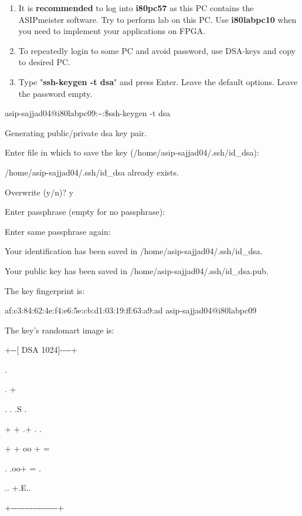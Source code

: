 \begin{enumerate}
	\def\labelenumi{\arabic{enumi}.}
	\setcounter{enumi}{7}
	\item
	It is \textbf{recommended} to log into \textbf{i80pc57} as this PC
	contains the ASIPmeister software. Try to perform lab on this PC. Use
	\textbf{i80labpc10} when you need to implement your applications on
	FPGA.
	\item
	To repeatedly login to some PC and avoid password, use DSA-keys and
	copy to desired PC.
	\item
	Type "\textbf{ssh-keygen -t dsa}" and press Enter. Leave the default
	options. Leave the password empty.
\end{enumerate}

asip-sajjad04@i80labpc09:\textasciitilde:\$ssh-keygen -t dsa

Generating public/private dsa key pair.

Enter file in which to save the key (/home/asip-sajjad04/.ssh/id\_dsa):

/home/asip-sajjad04/.ssh/id\_dsa already exists.

Overwrite (y/n)? y

Enter passphrase (empty for no passphrase):

Enter same passphrase again:

Your identification has been saved in /home/asip-sajjad04/.ssh/id\_dsa.

Your public key has been saved in /home/asip-sajjad04/.ssh/id\_dsa.pub.

The key fingerprint is:

af:c3:84:62:4e:f4:e6:5e:cb:d1:03:19:ff:63:a9:ad asip-sajjad04@i80labpc09

The key's randomart image is:

+-\/-{[} DSA 1024{]}-\/-\/-\/-+

\textbar{} \textbar{}

\textbar{} \textbar{}

\textbar{} . \textbar{}

\textbar{} . + \textbar{}

\textbar{} . . .S . \textbar{}

\textbar{} + + .+ . . \textbar{}

\textbar{} + + oo + = \textbar{}

\textbar{} . .oo+ = . \textbar{}

\textbar{} .. +.E.. \textbar{}

+-\/-\/-\/-\/-\/-\/-\/-\/-\/-\/-\/-\/-\/-\/-\/-\/-+

